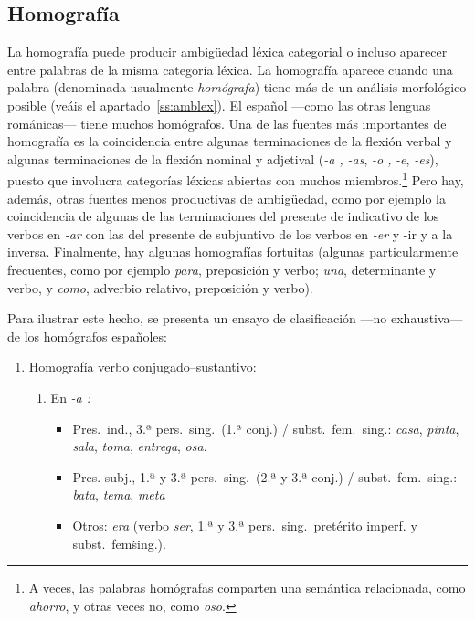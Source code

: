 {\subsection{Homografía} 

La homografía puede producir ambigüedad léxica categorial o incluso aparecer entre palabras de la misma categoría léxica. La homografía aparece cuando una palabra (denominada usualmente \emph{homógrafa}) tiene más de un análisis morfológico posible (veáis el apartado~\ref{ss:amblex}). El español ---como las otras lenguas románicas--- tiene muchos homógrafos. Una de las fuentes más importantes de homografía es la coincidencia entre algunas terminaciones de la flexión verbal y algunas terminaciones de la flexión nominal y adjetival (\emph{-a ,} \emph{-as}, \emph{-o ,} \emph{-e}, \emph{-es}), puesto que involucra categorías léxicas abiertas con muchos miembros.\footnote{A veces, las palabras homógrafas comparten una semántica relacionada, como \emph{ahorro}, y otras veces no, como \emph{oso}.} Pero hay, además, otras fuentes menos productivas de ambigüedad, como por ejemplo la coincidencia de algunas de las terminaciones del presente de indicativo de los verbos en \emph{-ar} con las del presente de subjuntivo de los verbos en \emph{-er} y -ir \emph{} y a la inversa. Finalmente, hay algunas homografías fortuitas (algunas particularmente frecuentes, como por ejemplo \emph{para}, preposición y verbo; \emph{una}, determinante y verbo, y  \emph{como}, adverbio relativo, preposición y verbo). 

Para ilustrar este hecho, se presenta un ensayo de clasificación ---no exhaustiva--- de los homógrafos españoles: 

\begin{enumerate} \item Homografía verbo conjugado--sustantivo: \begin{enumerate} 

\item En \emph{-a :} \begin{itemize} \item Pres.\ ind., 3.ª pers.\  sing.\ (1.ª conj.) / subst.\ fem.\ sing.: \emph{casa}, \emph{pinta}, \emph{ sala}, \emph{toma}, \emph{entrega}, \emph{osa}. \item Pres. subj., 1.ª y 3.ª pers.\ sing.\ (2.ª y 3.ª conj.) / subst.\ fem.\ sing.: \emph{bata}, \emph{tema}, \emph{meta} \item Otros: \emph{era} (verbo \emph{ser}, 1.ª y 3.ª pers.\ sing.\ pretérito imperf. y subst.\ fem\. sing.). \end{itemize} 


\end{enumerate}
\end{enumerate}}
